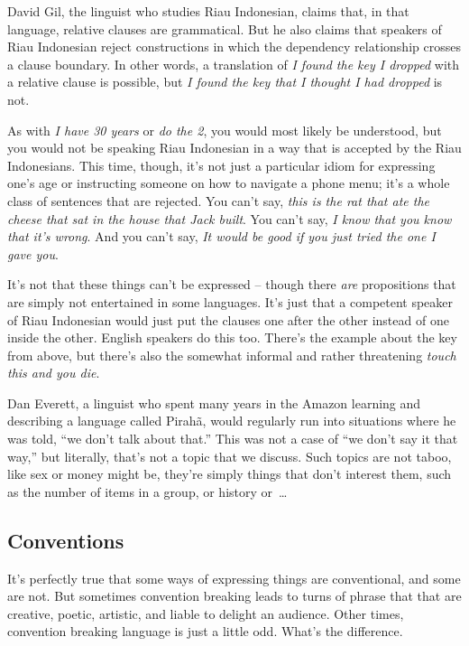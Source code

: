 David Gil, the linguist who studies Riau Indonesian, claims that, in that language, relative clauses are grammatical. But he also claims that speakers of Riau Indonesian reject constructions in which the dependency relationship crosses a clause boundary. In other words, a translation of \textit{I found the key I dropped} with a relative clause is possible, but \textit{I found the key that I thought I had dropped} is not. 

As with \textit{I have 30 years} or \textit{do the 2}, you would most likely be understood, but you would not be speaking Riau Indonesian in a way that is accepted by the Riau Indonesians. This time, though, it's not just a particular idiom for expressing one's age or instructing someone on how to navigate a phone menu; it's a whole class of sentences that are rejected. You can't say, \textit{this is the rat that ate the cheese that sat in the house that Jack built}. You can't say, \textit{I know that you know that it's wrong}. And you can't say, \textit{It would be good if you just tried the one I gave you}. 

It's not that these things can't be expressed -- though there \textit{are} propositions that are simply not entertained in some languages. It's just that a competent speaker of Riau Indonesian would just put the clauses one after the other instead of one inside the other. English speakers do this too. There's the example about the key from above, but there's also the somewhat informal and rather threatening \textit{touch this and you die}.

Dan Everett, a linguist who spent many years in the Amazon learning and describing a language called Pirahã, would regularly run into situations where he was told, \enquote{we don't talk about that.} This was not a case of \enquote{we don't say it that way,} but literally, that's not a topic that we discuss. Such topics are not taboo, like sex or money might be, they're simply things that don't interest them, such as the number of items in a group, or history or~\dots

\subsection{Conventions}

It's perfectly true that some ways of expressing things are conventional, and some are not. But sometimes convention breaking leads to turns of phrase that that are creative, poetic, artistic, and liable to delight an audience. Other times, convention breaking language is just a little odd. What's the difference.

